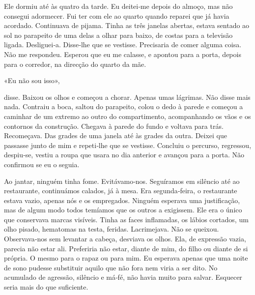 Ele dormiu até às quatro da tarde. Eu deitei­‑me depois do almoço, mas
não consegui adormecer. Fui ter com ele ao quarto quando reparei que já
havia acordado. Continuava de pijama. Tinha as três janelas abertas,
estava sentado ao sol no parapeito de uma delas a olhar para baixo, de
costas para a televisão ligada. Desliguei­‑a. Disse­‑lhe que se
vestisse. Precisaria de comer alguma coisa. Não me respondeu. Esperou
que eu me calasse, e apontou para a porta, depois para o corredor, na
direcção do quarto da mãe.

«Eu não sou isso»,

disse. Baixou os olhos e começou a chorar. Apenas umas lágrimas. Não
disse mais nada. Contraiu a boca, saltou do parapeito, colou o dedo à
parede e começou a caminhar de um extremo ao outro do compartimento,
acompanhando os vãos e os contornos da construção. Chegava à parede do
fundo e voltava para trás. Recomeçava. Das grades de uma janela até às
grades da outra. Deixei que passasse junto de mim e repeti­‑lhe que se
vestisse. Concluiu o percurso, regressou, despiu­‑se, vestiu a roupa que
usara no dia anterior e avançou para a porta. Não confirmou se eu o
seguia.

Ao jantar, ninguém tinha fome. Evitávamo­‑nos. Seguíramos em silêncio
até ao restaurante, continuámos calados, já à mesa. Era segunda­‑feira,
o restaurante estava vazio, apenas nós e os empregados. Ninguém esperava
uma justificação, mas de algum modo todos temíamos que os outros a
exigissem. Ele era o único que conservava marcas visíveis. Tinha as
faces inflamadas, os lábios cortados, um olho pisado, hematomas na
testa, feridas. Lacrimejava. Não se queixou. Observava­‑nos sem levantar
a cabeça, desviava os olhos. Ela, de expressão vazia, parecia não estar
ali. Preferiria não estar, diante de mim, do filho ou diante de si
própria. O mesmo para o rapaz ou para mim. Eu esperava apenas que uma
noite de sono pudesse substituir aquilo que não fora nem viria a ser
dito. No acumulado de agressão, silêncio e má­‑fé, não havia muito para
salvar. Esquecer seria mais do que suficiente.

